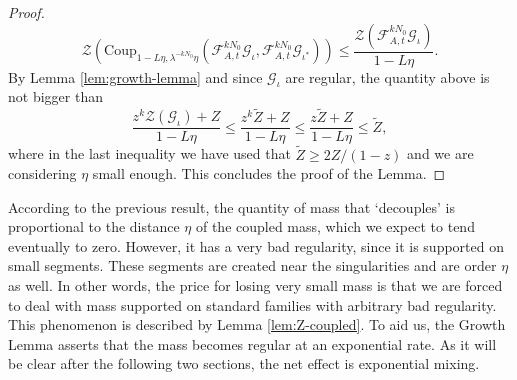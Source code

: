 \documentclass{amsart}
\numberwithin{equation}{section}
\renewcommand{\ge}{\geqslant}
\renewcommand{\le}{\leqslant}
\newcommand\cF{{\mathcal F}}
\newcommand\cG{{\mathcal G}}
\newcommand\cZ{{\mathcal Z}}
\newcommand{\catt}{\cF_{A,t}}
\newcommand{\Coup}{\text{Coup}}
\begin{document}
\begin{proof}
\[
 \cZ\left(\Coup_{1-L\eta, \lambda^{- kN_0}\eta}(\catt^{k N_0}\cG_{\iota}, \catt^{k N_0} \cG_{\iota^*})\right) \le \frac{\cZ\left(\catt^{k N_0}\cG_{\iota}\right)}{1- L \eta}.
\]
By Lemma \ref{lem:growth-lemma} and since \(\cG_{\iota}\) are regular, the quantity above is not bigger than
\[
\frac{z^k \cZ(\cG_{\iota}) + Z}{1 - L\eta} \le \frac{z^k \widetilde Z + Z}{1- L \eta} \le \frac{z \widetilde Z + Z}{1- L \eta} \le \widetilde Z,
\]
where in the last inequality we have used that \(\widetilde Z \ge 2Z/(1-z)\) and we are considering \(\eta\) small enough. This concludes the proof of the Lemma.
\end{proof}
According to the previous result, the quantity of mass that `decouples' is proportional to the distance \(\eta\) of the coupled mass, which we expect to tend eventually to zero. However, it has a very bad regularity, since it is supported on small segments. These segments are created near the singularities and are order \(\eta\) as well. In other words, the price for losing very small mass is that we are forced to deal with mass supported on standard families with arbitrary bad regularity. This phenomenon is described by Lemma \ref{lem:Z-coupled}. To aid us, the Growth Lemma asserts that the mass becomes regular at an exponential rate. As it will be clear after the following two sections, the net effect is exponential mixing. 
\end{document}

